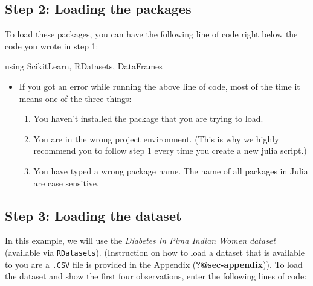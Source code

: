 \documentclass[
  letterpaper,
]{book}
\newenvironment{Shaded}{\begin{snugshade}}{\end{snugshade}}
\newcommand{\BuiltInTok}[1]{\textcolor[rgb]{0.00,0.23,0.31}{#1}}
\newcommand{\ImportTok}[1]{\textcolor[rgb]{0.00,0.46,0.62}{#1}}
\newcommand{\NormalTok}[1]{\textcolor[rgb]{0.00,0.23,0.31}{#1}}
\providecommand{\tightlist}{%
  \setlength{\itemsep}{0pt}\setlength{\parskip}{0pt}}\usepackage{longtable,booktabs,array}
\begin{document}
\hypertarget{step-2-loading-the-packages}{%
\subsection*{Step 2: Loading the
packages}\label{step-2-loading-the-packages}}

To load these packages, you can have the following line of code right
below the code you wrote in step 1:

\begin{Shaded}
\begin{Highlighting}[]
\ImportTok{using} \BuiltInTok{ScikitLearn}\NormalTok{, }\BuiltInTok{RDatasets}\NormalTok{, }\BuiltInTok{DataFrames}
\end{Highlighting}
\end{Shaded}

\begin{itemize}
\tightlist
\item
  If you got an error while running the above line of code, most of the
  time it means one of the three things:

  \begin{enumerate}
  \def\labelenumi{\arabic{enumi}.}
  \tightlist
  \item
    You haven't installed the package that you are trying to load.
  \item
    You are in the wrong project environment. (This is why we highly
    recommend you to follow step 1 every time you create a new julia
    script.)
  \item
    You have typed a wrong package name. The name of all packages in
    Julia are case sensitive.
  \end{enumerate}
\end{itemize}

\hypertarget{step-3-loading-the-dataset}{%
\subsection*{Step 3: Loading the
dataset}\label{step-3-loading-the-dataset}}

In this example, we will use the \emph{Diabetes in Pima Indian Women
dataset} (available via \texttt{RDatasets}). (Instruction on how to load
a dataset that is available to you are a \texttt{.CSV} file is provided
in the Appendix (\textbf{?@sec-appendix})). To load the dataset and show
the first four observations, enter the following lines of code:
\end{document}
